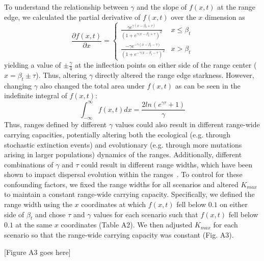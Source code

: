 \documentclass[11pt]{article}
\begin{document}
To understand the relationship between $\gamma$ and the slope of $f(x,t)$ at the range edge, we calculated the partial derivative of $f(x,t)$ over the $x$ dimension as
\begin{equation}
\frac{\partial f(x,t)}{\partial x}=
\begin{cases}
	\frac{\gamma e^{\gamma(x-\beta_{t}+\tau)}}{(1+e^{\gamma(x-\beta_{t}+\tau})^{2}} & x \leq \beta_{t} \\
	\frac{-\gamma e^{-\gamma(x-\beta_{t}-\tau)}}{(1+e^{-\gamma(x-\beta_{t}-\tau})^{2}} & x > \beta_{t}
\end{cases}	
\end{equation}
yielding a value of $\pm\frac{\gamma}{4}$ at the inflection points on either side of the range center ($x=\beta_{t}\pm\tau$). Thus, altering $\gamma$ directly altered the range edge starkness. However, changing $\gamma$ also changed the total area under $f(x,t)$ as can be seen in the indefinite integral of $f(x,t)$:
\begin{equation}
\int_{-\infty}^{\infty}f(x,t)dx = \frac{2ln(e^{\gamma\tau}+1)}{\gamma}
\end{equation}
Thus, ranges defined by different $\gamma$ values could also result in different range-wide carrying capacities, potentially altering both the ecological (e.g. through stochastic extinction events) and evolutionary (e.g. through more mutations arising in larger populations) dynamics of the ranges. Additionally, different combinations of $\gamma$ and $\tau$ could result in different range widths, which have been shown to impact dispersal evolution within the ranges~\citep{van1997integrodifference}. To control for these confounding factors, we fixed the range widths for all scenarios and altered $K_{max}$ to maintain a constant range-wide carrying capacity. Specifically, we defined the range width using the $x$ coordinates at which $f(x,t)$ fell below $0.1$ on either side of $\beta_{t}$ and chose $\tau$ and $\gamma$ values for each scenario such that $f(x,t)$ fell below $0.1$ at the same $x$ coordinates (Table A2). We then adjusted $K_{max}$ for each scenario so that the range-wide carrying capacity was constant (Fig. A3).

[Figure A3 goes here]
\end{document}
